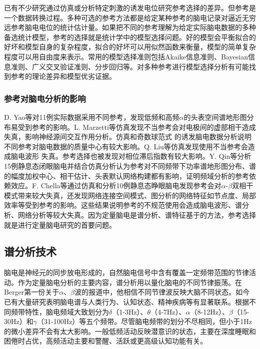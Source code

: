 已有不少研究通过仿真或分析特定刺激的诱发电位研究参考选择的差异。但参考是一个数据转换过程。多种可选的参考方法都是给定某种参考的脑电记录对逼近无穷远参考脑电电位的统计估计量。如果把不同的参考理解为给定实际脑电数据的多种备选统计模型，参考的选择就是统计学中的模型选择问题。好的模型会平衡拟合的好坏和模型自身的复杂程度，拟合的好坏可以用似然函数来衡量，模型的简单复杂程度可以用自由度来表示。常用的模型选择准则包括Akaike信息准则、Bayesian信息准则、广义交叉验证准则、分步回归等。对多种参考进行模型选择分析有可能找到参考的理论差异和模型优劣证据。

\subsubsection{参考对脑电分析的影响}
D. Yao等对11例实际数据采用不同参考，发现低频和高频$\alpha$的头表空间谱地形图分布易受到参考的影响。L. Marzetti等仿真发现不当参考会对电极间的虚部相干造成失真，影响神经源间交互作用分析。仿真和奇数球范式
的诱发脑电数据分析说明不同参考对脑电数据的质量中心有较大影响。Q. Liu等仿真发现使用不当参考会造成脑电波形
失真。参考选择也被发现对相位滞后指数有较大影响。Y. Qin等分析15例静息态闭眼脑电并结合仿真分析认为参考对不同频带下功率谱地形图分布、谱的幅度加权中心、相干估计、头表默认网络构建都有影响，证明频域分析的参考依赖效应。F. Chella等通过仿真和分析10例静息态睁眼脑电发现参考会对$\alpha$-$\beta$双相干模式带来较大失真，还发现网络连接空间模式、图分析的网络特征如节点度、局部效率等受到参考的影响。这些结果说明参考的不规范使用会造成脑电波形、谱分析、网络分析等较大失真。因为定量脑电是谱分析、谱特征基于的方法，参考选择就是进行定量脑电研究的首要问题。

\subsection{谱分析技术}
脑电是神经元的同步放电形成的，自然脑电信号中含有覆盖一定频带范围的节律活动。作为定量脑电分析的主要内容，谱分析用以量化脑电的不同节律振荡。在Berger第一份关于$\alpha$、$\beta$波的报道中，他相信不同节律波反映大脑不同状态。如今已有大量研究表明脑电谱与人类行为、认知状态、精神疾病等有显著联系。根据不同频带特性，脑电频域大致划分为$\delta$（1-3Hz）、$\theta$（4-7Hz）、$\alpha$（8-12Hz）、$\beta$（15-30Hz）和$\gamma$（31-100Hz）等五个频带。尽管脑电频带的划分不尽相同，但小于1Hz的微小差异不会有太大影响。一般低频活动反映潜意识的状态，主要在深度睡眠和困倦时占优，高频活动主要和警醒、活跃或更高级认知功能有关。

